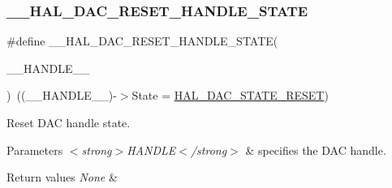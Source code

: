 \subsubsection{\texorpdfstring{\_\_HAL\_DAC\_RESET\_HANDLE\_STATE}{\_\_HAL\_DAC\_RESET\_HANDLE\_STATE}}
{\footnotesize\ttfamily \#define \+\_\+\+\_\+\+H\+A\+L\+\_\+\+D\+A\+C\+\_\+\+R\+E\+S\+E\+T\+\_\+\+H\+A\+N\+D\+L\+E\+\_\+\+S\+T\+A\+TE(\begin{DoxyParamCaption}\item[{}]{\+\_\+\+\_\+\+H\+A\+N\+D\+L\+E\+\_\+\+\_\+ }\end{DoxyParamCaption})~((\+\_\+\+\_\+\+H\+A\+N\+D\+L\+E\+\_\+\+\_\+)-\/$>$State = \mbox{\hyperlink{group___d_a_c___exported___types_gga4e917340aba1cc3afd4e9a7fef15e4a5a225221a33734e3bfaf96837205e9284a}{H\+A\+L\+\_\+\+D\+A\+C\+\_\+\+S\+T\+A\+T\+E\+\_\+\+R\+E\+S\+ET}})}



Reset D\+AC handle state. 


\begin{DoxyParams}{Parameters}
{\em $<$strong$>$\+H\+A\+N\+D\+L\+E$<$/strong$>$} & specifies the D\+AC handle. \\
\hline
\end{DoxyParams}

\begin{DoxyRetVals}{Return values}
{\em None} & \\
\hline
\end{DoxyRetVals}
